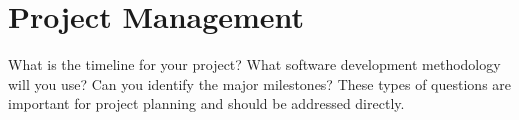 
\chapter{Project Management}

What is the timeline for your project? What software development
methodology will you use? Can you identify the major milestones? These types of questions are
important for project planning and should be addressed directly.
